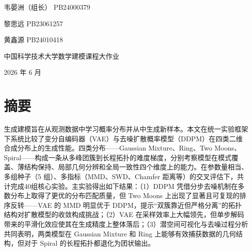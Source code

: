 \documentclass[UTF8,a4paper,12pt]{ctexart}
\begin{document}
\begin{titlepage}
\centering
\vspace*{3.0cm}

{\bfseries\color{warmprimary}\par}

\vspace{1.8cm}

{韦晏洲（组长） \quad PB24000379 \par}
\vspace{0.5cm}
{黎思远 \quad PB23061257 \par}
\vspace{0.5cm}
{黄鑫源 \quad PB24010418 \par}

\vfill

{中国科学技术大学\quad 数学建模课程大作业\par}
\vspace{0.5cm}
{2026 年 6 月\par}

\vspace{1.0cm}
\end{titlepage}

\tableofcontents
\clearpage

\section*{摘要}

生成建模旨在从观测数据中学习概率分布并从中生成新样本。本文在统一实验框架下系统比较了变分自编码器（VAE）与去噪扩散概率模型（DDPM）在四类二维合成分布上的生成性能。四类分布——Gaussian Mixture、Ring、Two Moons、Spiral——构成一条从多峰团簇到长程拓扑的难度梯度，分别考察模型在模式覆盖、薄结构保持、局部几何分辨和全局一致性四个维度上的能力。在参数量相当、多组种子（5 组）、多指标（MMD、SWD、Chamfer 距离等）的交叉评估下，共计完成40组核心实验。主实验得出如下结果：（1）DDPM 凭借分步去噪机制在多数分布上取得了更优的分布匹配质量，但 Two Moons 上出现了显著且可复现的排序反转——VAE 的 MMD 明显优于 DDPM，提示“双簇靠近但严格分离”的拓扑结构对扩散模型的收敛构成挑战；（2）VAE 在采样效率上大幅领先，但单步解码带来的平滑化效应使其在生成精度上整体落后；（3）潜空间可视化与去噪过程分析共同表明，两类模型在 Gaussian Mixture 和 Ring 上能够有效捕获数据的几何结构，但对于 Spiral 的长程拓扑都退化为团状输出。
\end{document}
